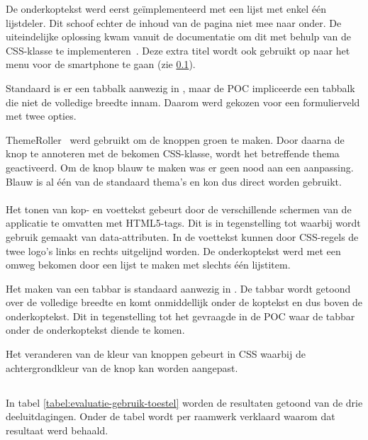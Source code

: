 De onderkoptekst werd eerst geïmplementeerd met een lijst met enkel één lijstdeler.
Dit schoof echter de inhoud van de pagina niet mee naar onder. 
De uiteindelijke oplossing kwam vanuit de documentatie om dit met behulp van de CSS-klasse  te implementeren~\cite{JQuery2013b}. 
Deze extra titel wordt ook gebruikt op naar het menu voor de smartphone te gaan (zie \ref{sec:evaluatie-gebruik-toestel}).

Standaard is er een tabbalk aanwezig in \jqm, maar de POC impliceerde een tabbalk die niet de volledige breedte innam.
Daarom werd gekozen voor een formulierveld met twee opties.

ThemeRoller~\cite{JQuery2012c} werd gebruikt om de knoppen groen te maken.
Door daarna de knop te annoteren met de bekomen CSS-klasse, wordt het betreffende thema geactiveerd. 
Om de knop blauw te maken was er geen nood aan een aanpassing.
Blauw is al één van de standaard thema's en kon dus direct worden gebruikt.

\paragraph{\lungo}
Het tonen van kop- en voettekst gebeurt door de verschillende schermen van de applicatie te omvatten met HTML5-tags.
Dit is in tegenstelling tot \jqm{} waarbij wordt gebruik gemaakt van data-attributen.
In de voettekst kunnen door CSS-regels de twee logo's links en rechts uitgelijnd worden.
De onderkoptekst werd met een omweg bekomen door een lijst te maken met slechts één lijstitem.

Het maken van een tabbar is standaard aanwezig in \lungo{}.
De tabbar wordt getoond over de volledige breedte en komt onmiddellijk onder de koptekst en dus boven de onderkoptekst.
Dit in tegenstelling tot het gevraagde in de POC waar de tabbar onder de onderkoptekst diende te komen.

Het veranderen van de kleur van knoppen gebeurt in CSS waarbij de achtergrondkleur van de knop kan worden aangepast.


\subsection{}
\label{sec:evaluatie-gebruik-toestel}

In tabel \ref{tabel:evaluatie-gebruik-toestel} worden de resultaten getoond van de drie deeluitdagingen.
Onder de tabel wordt per raamwerk verklaard waarom dat resultaat werd behaald.

